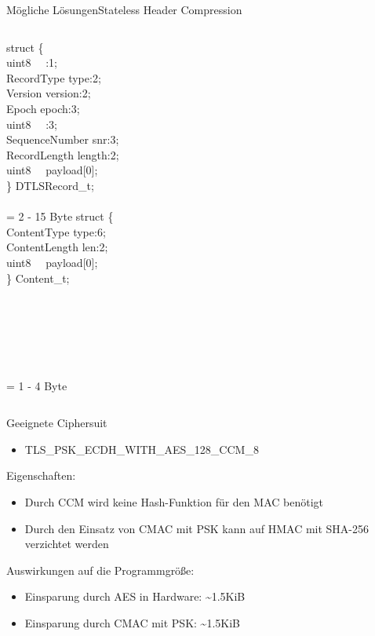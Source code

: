 \documentclass{beamer}
\begin{document}
\begin{frame}{Mögliche Lösungen}{Stateless Header Compression}
  \begin{columns}
      struct \{\\
      \qquad uint8 ~~:1;\\
      \qquad RecordType type:2;\\
      \qquad Version version:2;\\
      \qquad Epoch epoch:3;\\
      \qquad uint8 ~~:3;\\
      \qquad SequenceNumber snr:3;\\
      \qquad RecordLength length:2;\\
      \qquad uint8 ~~payload[0];\\
      \} DTLSRecord\_t;\\
      ~\\
      = 2 - 15 Byte
      struct \{\\
      \qquad ContentType type:6;\\
      \qquad ContentLength len:2;\\
      \qquad uint8 ~~payload[0];\\
      \} Content\_t;\\
      ~\\
      ~\\
      ~\\
      ~\\
      ~\\
      ~\\
      = 1 - 4 Byte
  \end{columns}
\end{frame}

\begin{frame}{Geeignete Ciphersuit}
  \begin{itemize}
    \item TLS\_PSK\_ECDH\_WITH\_AES\_128\_CCM\_8
  \end{itemize}
  Eigenschaften:
  \begin{itemize}
    \item Durch CCM wird keine Hash-Funktion \newline für den MAC benötigt
    \item Durch den Einsatz von CMAC mit PSK kann \newline auf HMAC mit SHA-256 verzichtet werden
  \end{itemize}
  Auswirkungen auf die Programmgröße:
  \begin{itemize}
    \item Einsparung durch AES in Hardware: \textasciitilde 1.5KiB
    \item Einsparung durch CMAC mit PSK: \textasciitilde 1.5KiB
  \end{itemize}
\end{frame}
\end{document}
